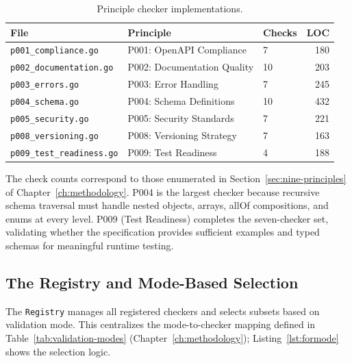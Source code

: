 \begin{table}[htbp]
\centering
\caption{Principle checker implementations.}
\label{tab:checker-implementations}
\small
\begin{tabular}{@{}lllr@{}}
\toprule
\textbf{File} & \textbf{Principle} & \textbf{Checks} & \textbf{LOC} \\
\midrule
\texttt{p001\_compliance.go}   & P001: OpenAPI Compliance     & 7  & 180 \\
\texttt{p002\_documentation.go} & P002: Documentation Quality  & 10 & 203 \\
\texttt{p003\_errors.go}       & P003: Error Handling          & 7  & 245 \\
\texttt{p004\_schema.go}       & P004: Schema Definitions      & 10 & 432 \\
\texttt{p005\_security.go}     & P005: Security Standards      & 7  & 221 \\
\texttt{p008\_versioning.go}   & P008: Versioning Strategy     & 7  & 163 \\
\texttt{p009\_test\_readiness.go} & P009: Test Readiness          & 4  & 188 \\
\bottomrule
\end{tabular}
\end{table}

The check counts correspond to those enumerated in Section~\ref{sec:nine-principles} of Chapter~\ref{ch:methodology}. P004 is the largest checker because recursive schema traversal must handle nested objects, arrays, allOf compositions, and enums at every level. P009 (Test Readiness) completes the seven-checker set, validating whether the specification provides sufficient examples and typed schemas for meaningful runtime testing.

\subsection{The Registry and Mode-Based Selection}
\label{subsec:registry}

The \texttt{Registry} manages all registered checkers and selects subsets based on validation mode. This centralizes the mode-to-checker mapping defined in Table~\ref{tab:validation-modes} (Chapter~\ref{ch:methodology}); Listing~\ref{lst:formode} shows the selection logic.

